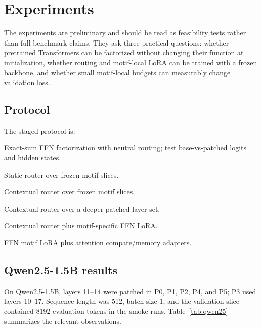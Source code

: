 \documentclass[11pt]{article}
\theoremstyle{definition}
\begin{document}
\section{Experiments}

The experiments are preliminary and should be read as feasibility tests rather than full benchmark claims. They ask three practical questions: whether pretrained Transformers can be factorized without changing their function at initialization, whether routing and motif-local LoRA can be trained with a frozen backbone, and whether small motif-local budgets can measurably change validation loss.

\subsection{Protocol}

The staged protocol is:
\begin{description}[leftmargin=2.2cm,style=nextline]
  \item[P0] Exact-sum FFN factorization with neutral routing; test base-vs-patched logits and hidden states.
  \item[P1] Static router over frozen motif slices.
  \item[P2] Contextual router over frozen motif slices.
  \item[P3] Contextual router over a deeper patched layer set.
  \item[P4] Contextual router plus motif-specific FFN LoRA.
  \item[P5] FFN motif LoRA plus attention compare/memory adapters.
\end{description}

\subsection{Qwen2.5-1.5B results}

On Qwen2.5-1.5B, layers 11--14 were patched in P0, P1, P2, P4, and P5; P3 used layers 10--17. Sequence length was 512, batch size 1, and the validation slice contained 8192 evaluation tokens in the smoke runs. Table~\ref{tab:qwen25} summarizes the relevant observations.
\end{document}

